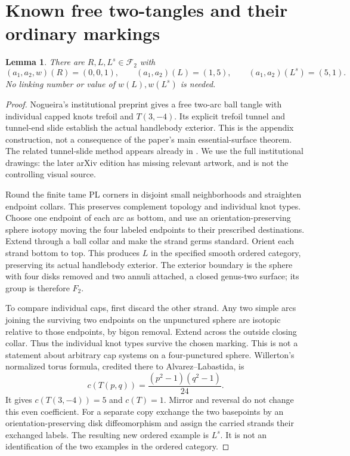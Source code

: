 \documentclass[11pt]{article}
\newtheorem{lemma}[theorem]{Lemma}
\theoremstyle{remark}\newtheorem{remark}[theorem]{Remark}
\newcommand{\F}{\mathcal F}
\begin{document}
\section{Known free two-tangles and their ordinary markings}
\begin{lemma}\label{lem:witnesses}
There are $R,L,L^s\in\F_2$ with
\begin{equation}\label{eq:witnesses}
(a_1,a_2,w)(R)=(0,0,1),\qquad
(a_1,a_2)(L)=(1,5),\qquad(a_1,a_2)(L^s)=(5,1).
\end{equation}
No linking number or value of $w(L),w(L^s)$ is needed.
\end{lemma}
\begin{proof}
Nogueira's institutional preprint \cite[Appendix \S4, pp.~14--15,
Figures 9--10]{Nogueira14} gives a free two-arc ball tangle with individual
capped knots trefoil and $T(3,-4)$. Its explicit trefoil tunnel and tunnel-end
slide establish the actual handlebody exterior. This is the appendix
construction, not a consequence of the paper's main essential-surface
theorem. The related tunnel-slide method appears already in
\cite[\S8]{Nogueira13}. We use the full institutional drawings: the later
arXiv edition \cite{Nogueira17} has missing relevant artwork, and is not the
controlling visual source.

Round the finite tame PL corners in disjoint small neighborhoods and
straighten endpoint collars. This preserves complement topology and
individual knot types. Choose one endpoint of each arc as bottom, and use
an orientation-preserving sphere isotopy moving the four labeled endpoints
to their prescribed destinations. Extend through a ball collar and make
the strand germs standard. Orient each strand bottom to top. This produces
$L$ in the specified smooth ordered category, preserving its actual
handlebody exterior. The exterior boundary is the sphere with four disks
removed and two annuli attached, a closed genus-two surface; its group is
therefore $F_2$.

To compare individual caps, first discard the other strand. Any two simple
arcs joining the surviving two endpoints on the unpunctured sphere are
isotopic relative to those endpoints, by bigon removal. Extend across the
outside closing collar. Thus the individual knot types survive the chosen
marking. This is not a statement about arbitrary cap systems on a
four-punctured sphere. Willerton's normalized torus formula,
credited there to Alvarez--Labastida, is
\cite[\S1 and \S3, p.~5]{Willerton}
\[
c(T(p,q))=\frac{(p^2-1)(q^2-1)}{24}.
\]
It gives $c(T(3,-4))=5$ and $c(T)=1$. Mirror and reversal do not change this
even coefficient. For a separate copy exchange the two basepoints by an
orientation-preserving disk diffeomorphism and assign the carried strands
their exchanged labels. The resulting new ordered example is $L^s$.
It is not an identification of the two examples in the ordered category.


\end{proof}
\end{document}
